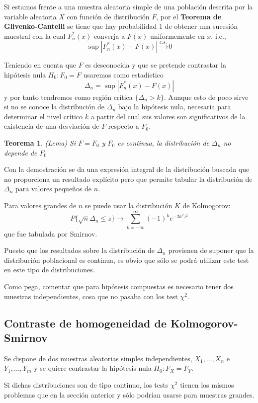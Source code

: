 \documentclass[a4paper,12pt]{article}
\newtheorem{theorem}{Teorema}
\begin{document}
Si estamos frente a una muestra aleatoria simple de una población descrita por la variable aleatoria $X$ con función de distribución $F$, por el \textbf{Teorema de Glivenko-Cantelli} se tiene que hay probabilidad 1 de obtener una sucesión muestral con la cual $F^*_n(x)$ converja a $F(x)$ uniformemente en $x$, i.e.,
$$\sup |F^*_n(x) - F(x)| \xrightarrow{c.s.} 0$$

Teniendo en cuenta que $F$ es desconocida y que se pretende contrastar la hipótesis nula $H_0 : F_0 = F$ usaremos como estadístico
$$\Delta_n = \sup |F^*_n(x) - F(x)|  $$
y por tanto tendremos como región crítica $\{\Delta_n > k\}$. Aunque esto de poco sirve si no se conoce la distribución de $\Delta_n$ bajo la hipótesis nula, necesaria para determinar el nivel crítico $k$ a partir del cual sus valores son significativos de la existencia de una desviación de $F$ respecto a $F_0$.

\begin{theorem}
(Lema) Si $F = F_0$ y $F_0$ es continua, la distribución de $\Delta_n$ no depende de $F_0$
\end{theorem}
Con la demostración se da una expresión integral de la distribución buscada que no proporciona un resultado explícito pero que permite tabular la distribución de $\Delta_n$ para valores pequeños de $n$.

Para valores grandes de $n$ se puede usar la distribución $K$ de Kolmogorov:
$$P\{\sqrt{n}\Delta_n \leq z \} \longrightarrow \sum^{\infty}_{k=-\infty} (-1)^{k} e^{-2k^2 z^2}  $$
que fue tabulada por Smirnov.

Puesto que los resultados sobre la distribución de $\Delta_n$ provienen de suponer que la distribución poblacional es continua, es obvio que sólo se podrá utilizar este test en este tipo de distribuciones.

Como pega, comentar que para hipótesis compuestas es necesario tener dos muestras independientes, cosa que no pasaba con los test $\chi^2$.



\subsection{Contraste de homogeneidad de Kolmogorov-Smirnov}

Se dispone de dos muestras aleatorias simples independientes, $X_1,...,X_n $ e $Y_1,...,Y_m$ y se quiere contrastar la hipótesis nula $H_0:F_X = F_Y$.

Si dichas distribuciones son de tipo continuo, los tests $\chi^2$ tienen los mismos problemas que en la sección anterior y sólo podrían usarse para muestras grandes.
\end{document}
